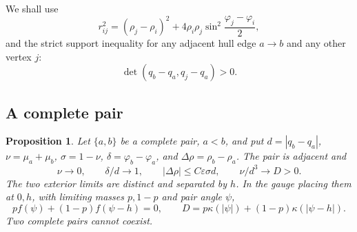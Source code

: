 \documentclass[11pt,a4paper]{article}
\numberwithin{equation}{section}
\newtheorem{proposition}[theorem]{Proposition}
\theoremstyle{remark}
\newcommand{\eps}{\varepsilon}
\begin{document}
We shall use
\begin{equation}\label{eq:distance}
 r_{ij}^2=(\rho_j-\rho_i)^2+4\rho_i\rho_j\sin^2\frac{\varphi_j-\varphi_i}{2},
\end{equation}
and the strict support inequality for any adjacent hull edge $a\to b$ and any other vertex $j$:
\begin{equation}\label{eq:support}
 \det(q_b-q_a,q_j-q_a)>0.
\end{equation}

\subsection{A complete pair}
\begin{proposition}\label{prop:pair-scale}
Let $\{a,b\}$ be a complete pair, $a<b$, and put $d=|q_b-q_a|$, $\nu=\mu_a+\mu_b$, $\sigma=1-\nu$, $\delta=\varphi_b-\varphi_a$, and $\Delta\rho=\rho_b-\rho_a$. The pair is adjacent and
\begin{equation}\label{eq:pair-scale}
 \nu\to0,\qquad \delta/d\to1,\qquad |\Delta\rho|\le C\eps\sigma d,
 \qquad \nu/d^3\to D>0.
\end{equation}
The two exterior limits are distinct and separated by $h$. In the gauge placing them at $0,h$, with limiting masses $p,1-p$ and pair angle $\psi$,
\[
 pf(\psi)+(1-p)f(\psi-h)=0,\qquad
 D=p\kappa(|\psi|)+(1-p)\kappa(|\psi-h|).
\]
Two complete pairs cannot coexist.
\end{proposition}
\end{document}
